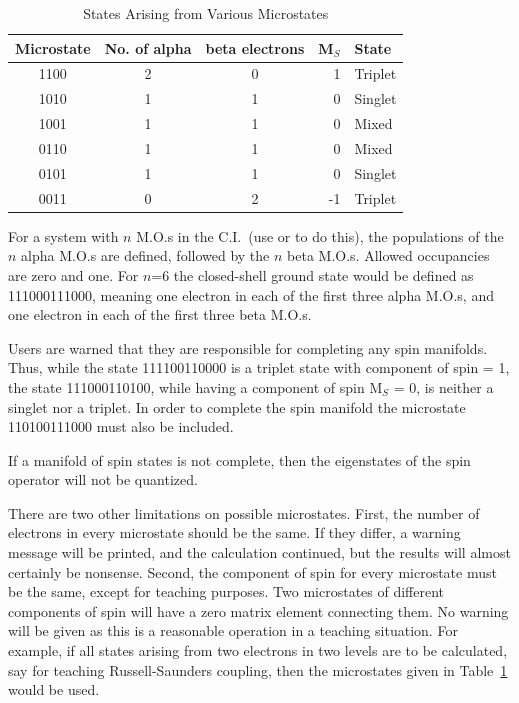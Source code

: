 \begin{table}
\begin{center}
\caption{\label{rs} States Arising from Various Microstates}
\begin{tabular}{cccrl}\\\hline
         Microstate  &    No. of alpha& beta electrons& M$_S$& State  \\\hline
           1100      &             2  &  0            & 1 & Triplet  \\
           1010      &             1  &  1            & 0 & Singlet  \\
           1001      &             1  &  1            & 0 & Mixed  \\
           0110      &             1  &  1            & 0 & Mixed  \\
           0101      &             1  &  1            & 0 & Singlet  \\
           0011      &             0  &  2            &-1 & Triplet  \\\hline
\end{tabular}
\end{center}
\end{table}
        For a system with $n$ M.O.s in the C.I.\ (use  or
     to
   do  this), the populations of the $n$ alpha M.O.s are defined, followed by
   the $n$ beta M.O.s.  Allowed occupancies are zero and one.   For  $n$=6  the
   closed-shell  ground  state would be defined as 111000111000, meaning one
   electron in each of the first three alpha M.O.s,  and  one  electron  in
   each of the first three beta M.O.s.

        Users are warned that they are responsible for completing  any  spin
   manifolds.   Thus, while  the  state 111100110000 is a triplet state with
   component of spin = 1, the state 111000110100, while having  a  component
   of spin M$_S$ = 0, is neither a singlet nor a triplet.  In order to complete the
   spin manifold the microstate 110100111000 must also be included.

        If a manifold of spin states is not complete, then  the  eigenstates
   of  the  spin  operator will not be quantized.

        There are two other limitations on possible microstates.  First, the
   number  of  electrons  in  every  microstate should be the same.  If they
   differ, a warning message will be printed, and the calculation  continued,
   but  the  results  will  almost  certainly  be  nonsense.   Second, the
   component of spin for every microstate  must  be  the  same,  except  for
   teaching  purposes.  Two microstates of different components of spin will
   have a zero matrix element connecting them.  No warning will be given  as
   this  is a reasonable operation in a teaching situation.  For example, if
   all states arising from two electrons in two levels are to be calculated,
   say for teaching Russell-Saunders coupling, then the microstates
given in Table~\ref{rs} would be used.

